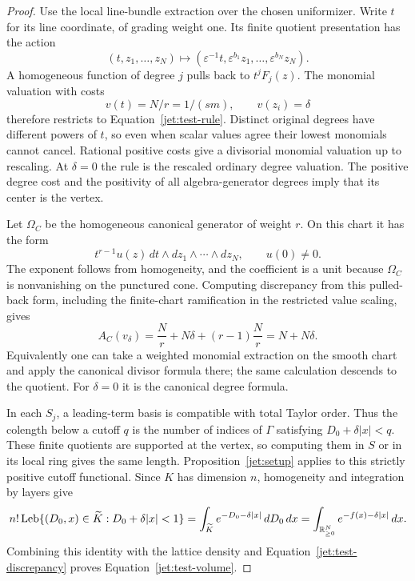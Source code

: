 \begin{proof}
Use the local line-bundle extraction over the chosen uniformizer.
Write $t$ for its line coordinate, of grading weight one. Its finite
quotient presentation has the action
\[
 (t,z_1,\ldots,z_N)\longmapsto
 (\varepsilon^{-1}t,\varepsilon^{b_1}z_1,\ldots,
                                      \varepsilon^{b_N}z_N).
\]
A homogeneous function of degree $j$ pulls back to $t^jF_j(z)$.
The monomial valuation with costs
\[
 v(t)=N/r=1/(sm),\qquad v(z_i)=\delta
\]
therefore restricts to Equation~\eqref{jet:test-rule}. Distinct original
degrees have different powers of $t$, so even when scalar values agree
their lowest monomials cannot cancel. Rational positive costs give a
divisorial monomial valuation up to rescaling. At $\delta=0$ the rule is
the rescaled ordinary degree valuation. The positive degree cost and
the positivity of all algebra-generator degrees imply that its center
is the vertex.

Let $\Omega_C$ be the homogeneous canonical generator of weight $r$.
On this chart it has the form
\[
 t^{r-1}u(z)\,dt\wedge dz_1\wedge\cdots\wedge dz_N,
 \qquad u(0)\ne0.
\]
The exponent follows from homogeneity, and the coefficient is a unit
because $\Omega_C$ is nonvanishing on the punctured cone. Computing
discrepancy from this pulled-back form, including the finite-chart
ramification in the restricted value scaling, gives
\[
 A_C(v_\delta)=\frac Nr+N\delta+(r-1)\frac Nr
             =N+N\delta.
\]
Equivalently one can take a weighted monomial extraction on the smooth
chart and apply the canonical divisor formula there; the same
calculation descends to the quotient. For $\delta=0$ it is the canonical
degree formula.

In each $S_j$, a leading-term basis is compatible with total Taylor
order. Thus the colength below a cutoff $q$ is the number of indices
of $\Gamma$ satisfying $D_0+\delta|x|<q$. These finite quotients are
supported at the vertex, so computing them in $S$ or in its local ring
gives the same length. Proposition~\ref{jet:setup} applies to this
strictly positive cutoff functional. Since $K$ has dimension $n$,
homogeneity and integration by layers give
\[
 n!\operatorname{Leb}\{(D_0,x)\in\widetilde K:D_0+\delta|x|<1\}
 =\int_{\widetilde K}e^{-D_0-\delta|x|}\,dD_0\,dx
 =\int_{\mathbb R_{\ge0}^N}e^{-f(x)-\delta|x|}\,dx.
\]
Combining this identity with the lattice density and
Equation~\eqref{jet:test-discrepancy} proves
Equation~\eqref{jet:test-volume}.
\end{proof}

